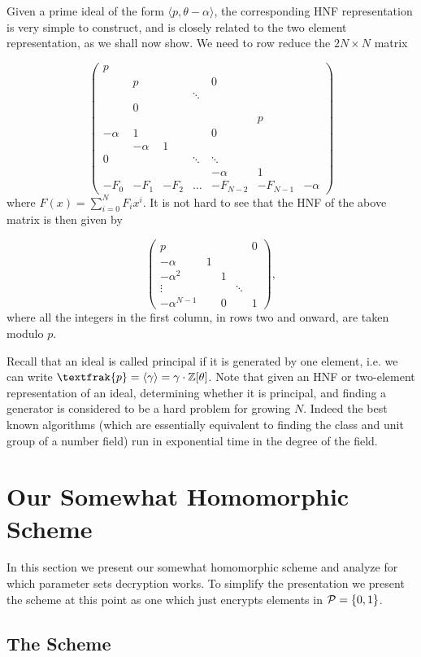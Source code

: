 \documentclass[a4paper, 12pt]{article}
\begin{document}
	Given a prime ideal of the form $\langle p, \theta - \alpha \rangle$, the corresponding HNF representation is very simple to construct, and is closely related to the two element
	representation, as we shall now show. We need to row reduce the $2N \times N$ matrix
	
	\[
		\begin{pmatrix}
		p & & & & & &\\
		& p & & & 0 & &\\
		& & & \ddots & & &\\
		& 0 & & & & &\\
		& & & & & p &\\
		-\alpha & 1 & & & 0 & &\\
		& -\alpha & 1 & & & &\\
		0 & & & \ddots & \ddots & &\\
		& & & & -\alpha & 1 &\\
		-F_0 & -F_1 & -F_2 & \ldots & -F_{N-2} & -F_{N-1} & -\alpha
		\end{pmatrix}
	\] %
	where $F(x) = \sum_{i=0}^{N}F_i x^i$. It is not hard to see that the HNF of the above matrix is then given by
	
	\[
		\begin{pmatrix}
		p & & & & 0\\
		-\alpha & 1 & & &\\
		-\alpha^2 & & 1 & &\\
		\vdots & & & \ddots &\\
		-\alpha^{N - 1} & & 0 & & 1
		\end{pmatrix},
	\] %
	where all the integers in the first column, in rows two and onward, are taken modulo $p$.
	
	Recall that an ideal is called principal if it is generated by one element, i.e. we can write $\textfrak{p} = \langle \gamma \rangle = \gamma \cdot \bb{Z}[\theta]$.
	Note that given an HNF or two-element representation of an ideal, determining whether it is principal, and finding a generator is considered to be a hard problem for growing $N$. Indeed the best known algorithms (which are essentially equivalent to finding the class and unit group of a number field) run in exponential time in the degree of the field.
	
	\section{Our Somewhat Homomorphic Scheme}
	
	In this section we present our somewhat homomorphic scheme and analyze for which parameter sets decryption works. To simplify the presentation we present the scheme at this point as one which just encrypts elements in $\mathcal{P} = \{0, 1\}$.
	
	\subsection{The Scheme}
	
\end{document}
